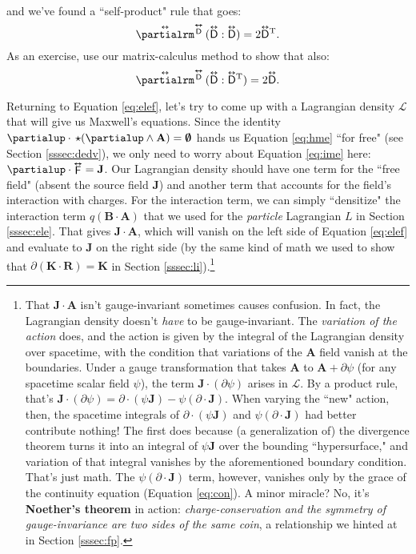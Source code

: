 \documentclass[12pt]{article}
\renewcommand{\vv}[1]{\mathbf{#1}}
\newcommand{\tightoverset}[2]{%
  \mathop{#2}\limits^{\vbox to -.5ex{\kern-0.75ex\hbox{$#1$}\vss}}}
\newcommand{\inlinedy}[1]{\tightoverset{\text{\tiny$\bm\leftrightarrow$}}{#1}}
\newcommand{\superoverset}[2]{%
  \mathop{#2}\limits^{\vbox to -.5ex{\kern-0.95ex\hbox{$#1$}\vss}}}
\newcommand{\superdy}[1]{\superoverset{\text{\tiny$\bm\leftrightarrow$}}{#1}}
\newcommand{\capdy}[1]{ \overset{ \text{\tiny$\bm\leftrightarrow$} }{\vphantom{\text{\small{A}}}\smash{#1}} }
\begin{document}
and we've found a ``self-product" rule that goes:
\begin{equation}\label{eq:dyoprule1}
\capdy{\partialrm} {}^{\superdy{\mathsf{D}}} \, ( \capdy{\mathsf{D}} : \capdy{\mathsf{D}} ) = 2 \capdy{\mathsf{D}} {}^\mathrm{T} .
\end{equation}
As an exercise, use our matrix-calculus method to show that also:
 \begin{equation}\label{eq:dyoprule2}
\capdy{\partialrm} {}^{\superdy{\mathsf{D}}} \, ( \capdy{\mathsf{D}} : \capdy{\mathsf{D}} {}^\mathrm{T} ) = 2 \capdy{\mathsf{D}} .
\end{equation}

Returning to Equation \ref{eq:elef}, let's try to come up with a Lagrangian density $\mathcal{L}$ that will give us Maxwell's equations. Since the identity $\partialup \cdot \, \star ( \partialup \wedge \vv A ) = \textrm{\mbox{\boldmath $\emptyset$}}$ hands us Equation \ref{eq:hme} ``for free" (see Section \ref{sssec:dedv}), we only need to worry about Equation \ref{eq:ime} here: $\partialup \cdot \inlinedy{\mathsf{F}} = \vv J$. Our Lagrangian density should have one term for the ``free field" (absent the source field $\vv J$) and another term that accounts for the field's interaction with charges. For the interaction term, we can simply ``densitize" the interaction term $q (\vv B \cdot \vv A)$ that we used for the \emph{particle} Lagrangian $L$ in Section \ref{sssec:ele}. That gives $\vv J \cdot \vv A$, which will vanish on the left side of Equation \ref{eq:elef} and evaluate to $\vv J$ on the right side (by the same kind of math we used to show that $\partialup ( \vv K \cdot \vv R ) = \vv K$ in Section \ref{sssec:li}).\footnote{That $\vv J \cdot \vv A$ isn't gauge-invariant sometimes causes confusion. In fact, the Lagrangian density doesn't \emph{have} to be gauge-invariant. The \emph{variation of the action} does, and the action is given by the integral of the Lagrangian density over spacetime, with the condition that variations of the $\vv A$ field vanish at the boundaries. Under a gauge transformation that takes $\vv A$ to $\vv A + \partialup \psi$ (for any spacetime scalar field $\psi$), the term $\vv J \cdot ( \partialup \psi )$ arises in $\mathcal{L}$. By a product rule, that's $\vv J \cdot ( \partialup \psi ) = \partialup \cdot (\psi \vv J) - \psi  ( \partialup \cdot \vv J )$. When varying the ``new" action, then, the spacetime integrals of $\partialup \cdot (\psi \vv J)$ and $\psi ( \partialup \cdot \vv J )$ had better contribute nothing! The first does because (a generalization of) the divergence theorem turns it into an integral of $\psi \vv J$ over the bounding ``hypersurface," and variation of that integral vanishes by the aforementioned boundary condition. That's just math. The $\psi ( \partialup \cdot \vv J )$ term, however, vanishes only by the grace of the continuity equation (Equation \ref{eq:con}). A minor miracle? No, it's \textbf{Noether's theorem} in action: \emph{charge-conservation and the symmetry of gauge-invariance are two sides of the same coin}, a relationship we hinted at in Section \ref{sssec:fp}.}
\end{document}
